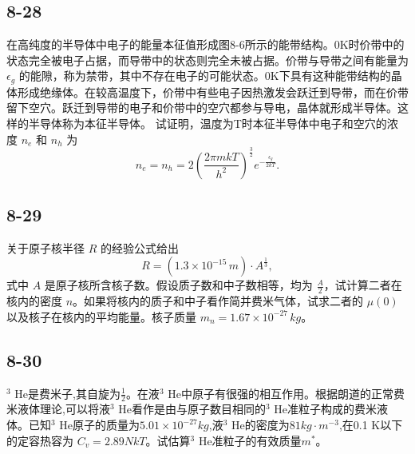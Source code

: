 \newpage
\subsection{8-28}
在高纯度的半导体中电子的能量本征值形成图8-6所示的能带结构。0K时价带中的状态完全被电子占据，而导带中的状态则完全未被占据。价带与导带之间有能量为 $\epsilon_g$ 的能隙，称为禁带，其中不存在电子的可能状态。0K下具有这种能带结构的晶体形成绝缘体。在较高温度下，价带中有些电子因热激发会跃迁到导带，而在价带留下空穴。跃迁到导带的电子和价带中的空穴都参与导电，晶体就形成半导体。这样的半导体称为本征半导体。
试证明，温度为T时本征半导体中电子和空穴的浓度 $n_e$ 和 $n_h$ 为
$$ n_e = n_h = 2 \left( \frac{2\pi mkT}{h^2} \right)^{\frac{3}{2}} e^{-\frac{\epsilon_g}{2kT}}. $$

\newpage
\subsection{8-29}
关于原子核半径 $R$ 的经验公式给出
$$ R = (1.3 \times 10^{-15} \, m) \cdot A^{\frac{1}{3}}, $$
式中 $A$ 是原子核所含核子数。假设质子数和中子数相等，均为 $\frac{A}{2}$，试计算二者在核内的密度 $n$。如果将核内的质子和中子看作简并费米气体，试求二者的 $\mu (0)$ 以及核子在核内的平均能量。核子质量 $m_n = 1.67 \times 10^{-27} \, kg$。

\newpage
\subsection{8-30}
$^3$ He是费米子,其自旋为$\frac{1}{2}$。在液$^3$ He中原子有很强的相互作用。根据朗道的正常费米液体理论,可以将液$^3$ He看作是由与原子数目相同的$^3$ He准粒子构成的费米液体。已知$^3$ He原子的质量为$5.01 \times 10^{-27} kg$,液$^3$ He的密度为$81 kg·m^{-3}$,在0.1 K以下的定容热容为 $C_v = 2.89NkT$。试估算$^3$ He准粒子的有效质量$m^*$。
